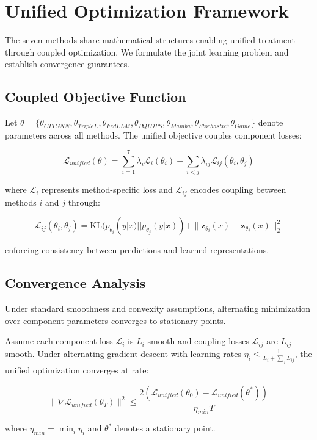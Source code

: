 \section{Unified Optimization Framework}
\label{sec:models_unified}

The seven methods share mathematical structures enabling unified treatment through coupled optimization. We formulate the joint learning problem and establish convergence guarantees.

\subsection{Coupled Objective Function}

Let $\theta = \{\theta_{CTTGNN}, \theta_{TripleE}, \theta_{FedLLM}, \theta_{PQIDPS}, \theta_{Mamba}, \theta_{Stochastic}, \theta_{Game}\}$ denote parameters across all methods. The unified objective couples component losses:

\begin{equation}
\mathcal{L}_{unified}(\theta) = \sum_{i=1}^7 \lambda_i \mathcal{L}_i(\theta_i) + \sum_{i<j} \lambda_{ij} \mathcal{L}_{ij}(\theta_i, \theta_j)
\end{equation}

where $\mathcal{L}_i$ represents method-specific loss and $\mathcal{L}_{ij}$ encodes coupling between methods $i$ and $j$ through:

\begin{equation}
\mathcal{L}_{ij}(\theta_i, \theta_j) = \text{KL}(p_{\theta_i}(y|x) || p_{\theta_j}(y|x)) + \|\mathbf{z}_{\theta_i}(x) - \mathbf{z}_{\theta_j}(x)\|_2^2
\end{equation}

enforcing consistency between predictions and learned representations.

\subsection{Convergence Analysis}

Under standard smoothness and convexity assumptions, alternating minimization over component parameters converges to stationary points.

\begin{theorem}
\label{thm:unified_convergence}
Assume each component loss $\mathcal{L}_i$ is $L_i$-smooth and coupling losses $\mathcal{L}_{ij}$ are $L_{ij}$-smooth. Under alternating gradient descent with learning rates $\eta_i \leq \frac{1}{L_i + \sum_j L_{ij}}$, the unified optimization converges at rate:

\begin{equation}
\|\nabla \mathcal{L}_{unified}(\theta_T)\|^2 \leq \frac{2(\mathcal{L}_{unified}(\theta_0) - \mathcal{L}_{unified}(\theta^*))}{\eta_{min} T}
\end{equation}

where $\eta_{min} = \min_i \eta_i$ and $\theta^*$ denotes a stationary point.
\end{theorem}

